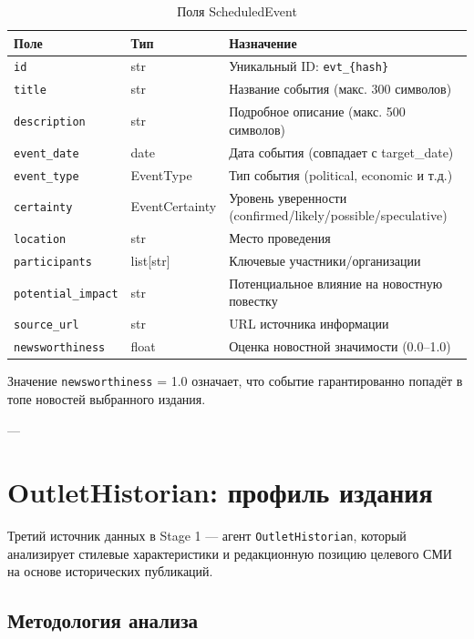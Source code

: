 \begin{table}[h!]
\centering
\caption{Поля ScheduledEvent}
\label{tab:scheduled_event}
\small
\begin{tabular}{|l|l|l|}
\hline
\textbf{Поле} & \textbf{Тип} & \textbf{Назначение} \\
\hline
\texttt{id} & str & Уникальный ID: \texttt{evt\_\{hash\}} \\
\texttt{title} & str & Название события (макс. 300 символов) \\
\texttt{description} & str & Подробное описание (макс. 500 символов) \\
\texttt{event\_date} & date & Дата события (совпадает с target\_date) \\
\texttt{event\_type} & EventType & Тип события (political, economic и т.д.) \\
\texttt{certainty} & EventCertainty & Уровень уверенности (confirmed/likely/possible/speculative) \\
\texttt{location} & str & Место проведения \\
\texttt{participants} & list[str] & Ключевые участники/организации \\
\texttt{potential\_impact} & str & Потенциальное влияние на новостную повестку \\
\texttt{source\_url} & str & URL источника информации \\
\texttt{newsworthiness} & float & Оценка новостной значимости (0.0--1.0) \\
\hline
\end{tabular}
\end{table}

Значение \texttt{newsworthiness} = 1.0 означает, что событие гарантированно попадёт в топе новостей выбранного издания.

---

\section{OutletHistorian: профиль издания}

Третий источник данных в Stage 1 --- агент \texttt{OutletHistorian}, который анализирует стилевые характеристики и редакционную позицию целевого СМИ на основе исторических публикаций.


\subsection{Методология анализа}

